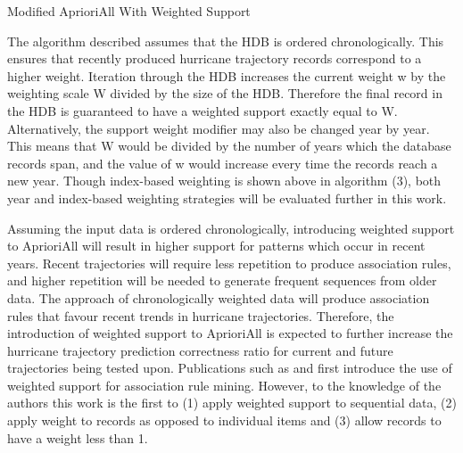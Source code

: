 \documentclass[12pt,conference]{IEEEtran}
\begin{document}
\begin{algorithm}[H]
  \caption{Modified AprioriAll With Weighted Support}
  \label{aprioriall_for_hurricanes}
  \begin{algorithmic}[1]
    \EndFor
  \EndFor
  \end{algorithmic}
\end{algorithm}

The algorithm described assumes that the HDB is ordered chronologically. This ensures that recently produced hurricane trajectory records correspond to a higher weight. Iteration through the HDB increases the current weight w by the weighting scale W divided by the size of the HDB. Therefore the final record in the HDB is guaranteed to have a weighted support exactly equal to W. Alternatively, the support weight modifier may also be changed year by year. This means that W would be divided by the number of years which the database records span, and the value of w would increase every time the records reach a new year. Though index-based weighting is shown above in algorithm (3), both year and index-based weighting strategies will be evaluated further in this work.

Assuming the input data is ordered chronologically, introducing weighted support to AprioriAll will result in higher support for patterns which occur in recent years. Recent trajectories will require less repetition to produce association rules, and higher repetition will be needed to generate frequent sequences from older data. The approach of chronologically weighted data will produce association rules that favour recent trends in hurricane trajectories. Therefore, the introduction of weighted support to AprioriAll is expected to further increase the hurricane trajectory prediction correctness ratio for current and future trajectories being tested upon. Publications such as \cite{war-mining} and \cite{cai-weighted-thesis} first introduce the use of weighted support for association rule mining. However, to the knowledge of the authors this work is the first to (1) apply weighted support to sequential data, (2) apply weight to records as opposed to individual items and (3) allow records to have a weight less than 1.
\end{document}
